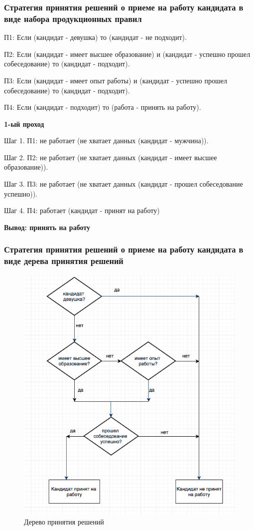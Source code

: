\documentclass[14pt,a4paper,report]{report}
\begin{document}
\subsubsection{Стратегия принятия решений о приеме на работу кандидата в виде набора продукционных правил}


П1: Если (кандидат - девушка) то (кандидат - не подходит).

П2: Если (кандидат - имеет высшее образование) и (кандидат - успешно прошел собеседование) то (кандидат - подходит).

П3: Если (кандидат - имеет опыт работы) и (кандидат - успешно прошел собеседование) то (кандидат - подходит).

П4: Если (кандидат - подходит) то (работа - принять на работу).

\textbf{1-ый проход}

Шаг 1. П1: не работает (не хватает данных (кандидат - мужчина)).

Шаг 2. П2: не работает (не хватает данных (кандидат - имеет высшее образование)).

Шаг 3. П3: не работает (не хватает данных (кандидат - прошел собеседование успешно)).

Шаг 4. П4:  работает (кандидат - принят на работу)

\textbf{Вывод: принять на работу}

\subsubsection{Стратегия принятия решений о приеме на работу кандидата в виде дерева принятия решений}

\begin{figure}[h!]
\centering
\includegraphics[scale = 0.60]{images/tree.jpg}
\caption{Дерево принятия решений}
\label{image:2}
\end{figure}
\end{document}
